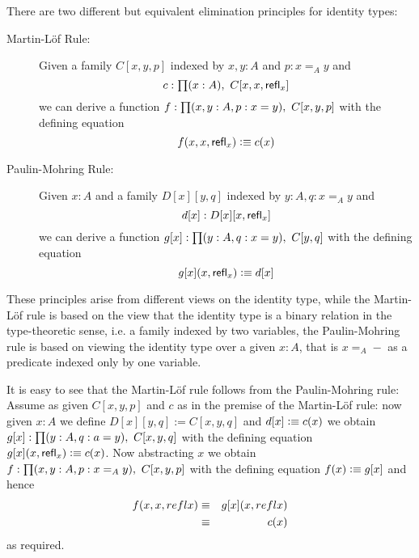 There are two different but equivalent elimination principles for
identity types:
\begin{description}
\item[Martin-L\"{o}f Rule:] 
Given a family $C[x,y,p]$ indexed by $x,y:A$ and $p:x=_A y$ and 
\[c:\prd{x:A} C[x,x,\refl{x}]\]
we can derive a function $f:\prd{x,y:A,p:x = y}C[x,y,p]$ with the
defining equation 
\[ f(x,x,\mathsf{refl}_{x}) \vcentcolon\equiv c(x) \]
\item[Paulin-Mohring Rule:] 
Given $x:A$ and a family $D[x][y,q]$ indexed by $y:A,q:x=_A y$ and 
\[ d[x]:D[x][x,\mathsf{refl}_{x}] \]
we can derive a function $g[x]:\prd{y:A,q:x = y}C[y,q]$ with the defining
equation 
\[ g[x](x,\mathsf{refl}_{x}) \vcentcolon\equiv d[x] \]
\end{description}
These principles arise from different views on the identity type,
while the Martin-L\"of rule is based on the view that the identity
type is a binary relation in the type-theoretic sense, i.e. a family
indexed by two variables, the Paulin-Mohring rule is based on viewing
the identity type over a given $x:A$, that is $x =_A -$ as a predicate
indexed only by one variable.

It is easy to see that the Martin-L\"of rule follows from the
Paulin-Mohring rule: Assume as given $C[x,y,p]$ and $c$ as in the
premise of the Martin-L\"of rule: now given $x:A$ we define $D[x][y,q] :=
C[x,y,q]$ and $d[x] \vcentcolon\equiv c(x)$ we obtain $g[x]:\prd{y:A,q:a = y}C[x,y,q]$
with the defining equation $g[x](x,\mathsf{refl}_{x}) \vcentcolon\equiv c(x)$. Now
abstracting $x$ we obtain $f : \prd{x,y:A,p:x =_A y}C[x,y,p]$ with the
defining equation $f(x) \vcentcolon\equiv g[x]$ and hence 
\begin{eqnarray*}
f(x,x,refl{x}) & \equiv & g[x](x,refl{x})  \\
                   & \equiv & c(x)
\end{eqnarray*}
as required.

